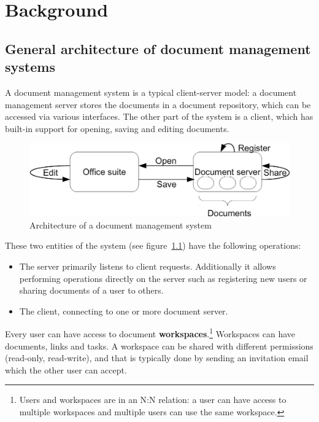 \chapter{Background}

\section{General architecture of document management systems}

A document management system is a typical client-server model: a document
management server stores the documents in a document repository, which can be
accessed via various interfaces.  The other part of the system is a client,
which has built-in support for opening, saving and editing documents.

\begin{figure}[H]
\centering
\includegraphics[width=450px,keepaspectratio]{general-arch-of-doc-mgmt-systems.pdf}
\caption{Architecture of a document management system}
\label{fig:general-arch-of-doc-mgmt-systems}
\end{figure}

These two entities of the system (see
figure~\ref{fig:general-arch-of-doc-mgmt-systems}) have the following
operations:

\begin{itemize}
\item The server primarily listens to client requests. Additionally it allows
performing operations directly on the server such as registering new users or
sharing documents of a user to others.
\item The client, connecting to one or more document server.
\end{itemize}

Every user can have access to document \textbf{workspaces}.\footnote{Users and workspaces are in an N:N relation: a user can have access to multiple workspaces and multiple users can use the same workspace.} Workspaces can have documents,
links and tasks. A workspace can be shared with different permissions
(read-only, read-write), and that is typically done by sending an invitation
email which the other user can accept.

